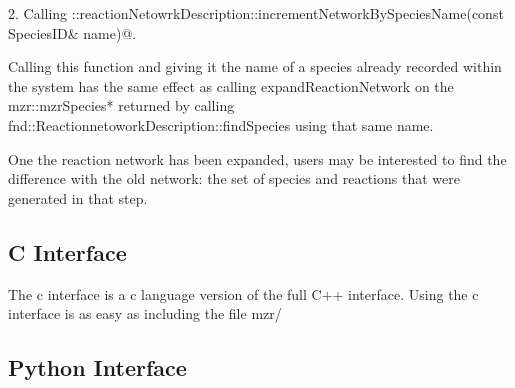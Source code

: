 2.  Calling
\lstinline@fnd::reactionNetowrkDescription::incrementNetworkBySpeciesName(const SpeciesID& name)@.  

Calling this function and giving it the name of a species already
recorded within the system has the same effect as calling
expandReactionNetwork on the mzr::mzrSpecies* returned by calling
fnd::ReactionnetoworkDescription::findSpecies using that same name. 

One the reaction network has been expanded, users may be interested to
find the difference with the old network: the set of species and
reactions that were generated in that step.  





\subsection{C Interface}
  The c interface is a c language version of the full C++ interface.  Using the c interface is as easy as including the file mzr/ 
\subsection{Python Interface}







